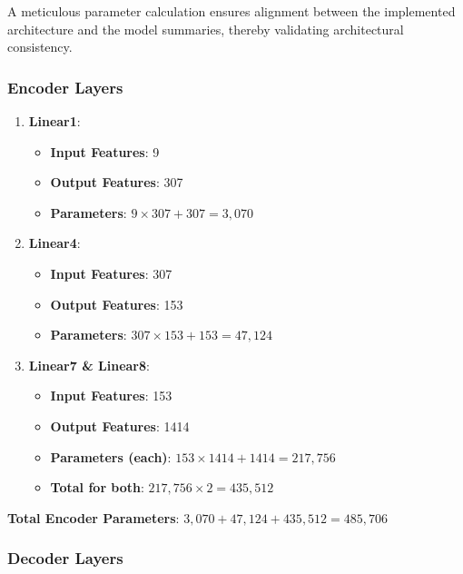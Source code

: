 \documentclass[10pt]{article}
\begin{document}
A meticulous parameter calculation ensures alignment between the implemented architecture and the model summaries, thereby validating architectural consistency.

\subsubsection{Encoder Layers}

\begin{enumerate}
    \item \textbf{Linear1}:
    \begin{itemize}
        \item \textbf{Input Features}: 9
        \item \textbf{Output Features}: 307
        \item \textbf{Parameters}: \( 9 \times 307 + 307 = 3,070 \)
    \end{itemize}
    
    \item \textbf{Linear4}:
    \begin{itemize}
        \item \textbf{Input Features}: 307
        \item \textbf{Output Features}: 153
        \item \textbf{Parameters}: \( 307 \times 153 + 153 = 47,124 \)
    \end{itemize}
    
    \item \textbf{Linear7 \& Linear8}:
    \begin{itemize}
        \item \textbf{Input Features}: 153
        \item \textbf{Output Features}: 1414
        \item \textbf{Parameters (each)}: \( 153 \times 1414 + 1414 = 217,756 \)
        \item \textbf{Total for both}: \( 217,756 \times 2 = 435,512 \)
    \end{itemize}
\end{enumerate}

\textbf{Total Encoder Parameters}: \( 3,070 + 47,124 + 435,512 = 485,706 \)

\subsubsection{Decoder Layers}
\end{document}
